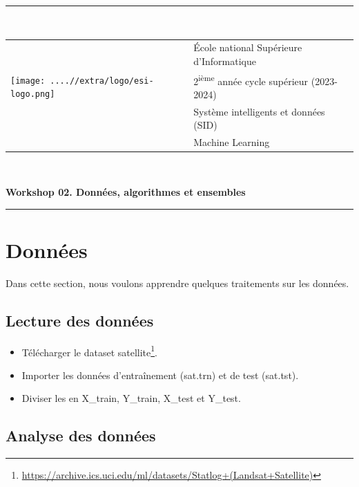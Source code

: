 \documentclass[12pt, a4paper]{article}
\begin{document}

\noindent\rule{\textwidth}{1pt}\\[0.25cm]
\noindent
\begin{tabular}{ll}
\multirow{3}{*}{\texttt{[image: ....//extra/logo/esi-logo.png]}} & \'Ecole national Supérieure d'Informatique\\
& 2\textsuperscript{ième} année cycle supérieur (2023-2024)\\
& Système intelligents et données (SID)\\
& Machine Learning\\
\end{tabular}\\[.25cm]
\noindent
\begin{center}
{\LARGE\bfseries Workshop 02. Données, algorithmes et ensembles}\\
\end{center}
\noindent\rule{\textwidth}{1pt}


\section{Données}

Dans cette section, nous voulons apprendre quelques traitements sur les données.

\subsection{Lecture des données}

\begin{itemize}
	\item Télécharger le dataset satellite\footnote{\url{https://archive.ics.uci.edu/ml/datasets/Statlog+(Landsat+Satellite)}}.
	\item Importer les données d'entraînement (sat.trn) et de test (sat.tst).
	\item Diviser les en X\_train, Y\_train, X\_test et Y\_test.
\end{itemize}

\subsection{Analyse des données}
\end{document}
